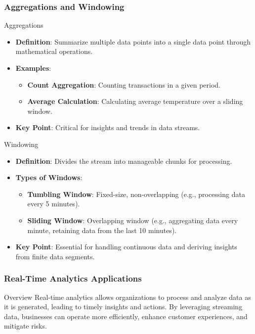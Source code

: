 \documentclass[aspectratio=169]{beamer}
\begin{document}
\begin{frame}[fragile]
    \frametitle{Aggregations and Windowing}
    \begin{block}{Aggregations}
        \begin{itemize}
            \item \textbf{Definition}: Summarize multiple data points into a single data point through mathematical operations.
            \item \textbf{Examples}:
                \begin{itemize}
                    \item \textbf{Count Aggregation}: Counting transactions in a given period.
                    \item \textbf{Average Calculation}: Calculating average temperature over a sliding window.
                \end{itemize}
            \item \textbf{Key Point}: Critical for insights and trends in data streams.
        \end{itemize}
    \end{block}

    \begin{block}{Windowing}
        \begin{itemize}
            \item \textbf{Definition}: Divides the stream into manageable chunks for processing.
            \item \textbf{Types of Windows}:
                \begin{itemize}
                    \item \textbf{Tumbling Window}: Fixed-size, non-overlapping (e.g., processing data every 5 minutes).
                    \item \textbf{Sliding Window}: Overlapping window (e.g., aggregating data every minute, retaining data from the last 10 minutes).
                \end{itemize}
            \item \textbf{Key Point}: Essential for handling continuous data and deriving insights from finite data segments.
        \end{itemize}
    \end{block}
\end{frame}

\begin{frame}[fragile]
    \frametitle{Real-Time Analytics Applications}
    \begin{block}{Overview}
        Real-time analytics allows organizations to process and analyze data as it is generated, leading to timely insights and actions. By leveraging streaming data, businesses can operate more efficiently, enhance customer experiences, and mitigate risks.
    \end{block}
\end{frame}
\end{document}
